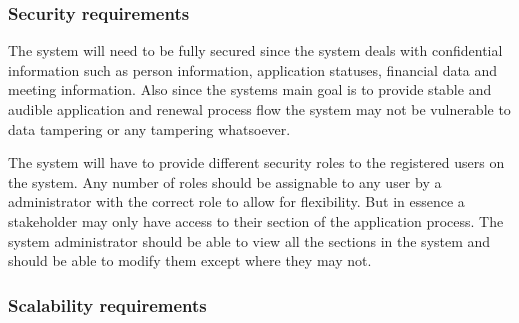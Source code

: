 \documentclass[12pt]{article}
\begin{document}
\vspace{0.1in}

\subsubsection{Security requirements}

\begin{flushleft}

The system will need to be fully secured since the system deals with confidential information such as person information, application statuses, financial data and meeting information. Also since the systems main goal is to provide stable and audible application and renewal process flow the system may not be vulnerable to data tampering or any tampering whatsoever. \\
\vspace{0.1in}

The system will have to provide different security roles to the registered users on the system. Any number of roles should be assignable to any user by a administrator with the correct role to allow for flexibility.
But in essence a stakeholder may only have access to their section of the application process. The system administrator should be able to view all the sections in the system and should be able to modify them except where they may not.

\end{flushleft}

\vspace{0.1in}

\subsubsection{Scalability requirements}
\end{document}
